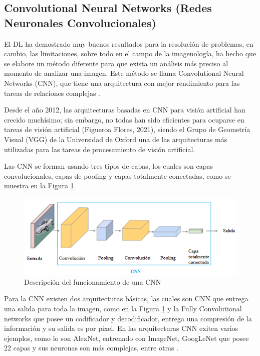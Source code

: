 \subsection{Convolutional Neural Networks (Redes Neuronales Convolucionales)}
El DL ha demostrado muy buenos resultados para la resolución de problemas, en cambio, las limitaciones, sobre todo en el campo de la imagenología, ha hecho que se elabore un método diferente para que exista un análisis más preciso al momento de analizar una imagen. Este método se llama Convolutional Neural Networks (CNN), que tiene una arquitectura con mejor rendimiento para las tareas de relaciones complejas \cite{Pena-Torres}. \\
\par Desde el año 2012, las arquitecturas basadas en CNN para visión artificial han crecido muchísimo; sin embargo, no todas han sido eficientes para ocuparse en tareas de visión artificial (Figueroa Flores, 2021), siendo el Grupo de Geometría Visual (VGG) de la Universidad de Oxford \cite{Simonyan2015} una de las arquitecturas más utilizadas para las tareas de procesamiento de visión artificial. \\
\par Las CNN se forman usando tres tipos de capas, los cuales son capas convolucionales, capas de pooling y capas totalmente conectadas, como se muestra en la Figura \ref{fig:CNN}.\\

\begin{figure}[H]
	\centering
	\includegraphics[scale=0.7]{img/Marco Teorico/convulcioinales.png}  
	\caption{Descripción del funcionamiento de una CNN \cite{Carola}}
	\label{fig:CNN}
\end{figure}

\par Para la CNN existen dos arquitecturas básicas, las cuales son CNN que entrega una salida para toda la imagen, como en la Figura \ref{fig:CNN} y la Fully Convolutional networks que posee un codificador y decodificador, entrega una compresión de la información y su salida es por pixel. En las arquitecturas CNN exiten varios ejemplos, como lo son AlexNet, entrenado con ImageNet, GoogLeNet que posee 22 capas y sus neuronas son más complejas, entre otras \cite{NIPS2012_c399862d}.\\


